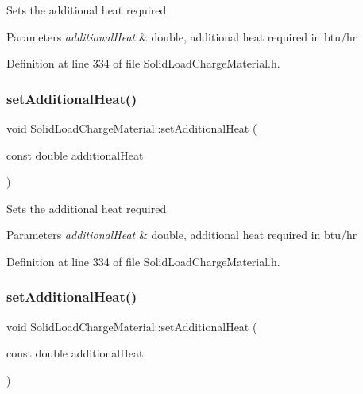 Sets the additional heat required 
\begin{DoxyParams}{Parameters}
{\em additional\+Heat} & double, additional heat required in btu/hr \\
\hline
\end{DoxyParams}


Definition at line 334 of file Solid\+Load\+Charge\+Material.\+h.

\mbox{\label{class_solid_load_charge_material_a849fd29a3ecb95be2e9d34f9280b1b94}} 
\subsubsection{\texorpdfstring{set\+Additional\+Heat()}{setAdditionalHeat()}\hspace{0.1cm}{\footnotesize\ttfamily [2/3]}}
{\footnotesize\ttfamily void Solid\+Load\+Charge\+Material\+::set\+Additional\+Heat (\begin{DoxyParamCaption}\item[{const double}]{additional\+Heat }\end{DoxyParamCaption})\hspace{0.3cm}{\ttfamily [inline]}}

Sets the additional heat required 
\begin{DoxyParams}{Parameters}
{\em additional\+Heat} & double, additional heat required in btu/hr \\
\hline
\end{DoxyParams}


Definition at line 334 of file Solid\+Load\+Charge\+Material.\+h.

\mbox{\label{class_solid_load_charge_material_a849fd29a3ecb95be2e9d34f9280b1b94}} 
\subsubsection{\texorpdfstring{set\+Additional\+Heat()}{setAdditionalHeat()}\hspace{0.1cm}{\footnotesize\ttfamily [3/3]}}
{\footnotesize\ttfamily void Solid\+Load\+Charge\+Material\+::set\+Additional\+Heat (\begin{DoxyParamCaption}\item[{const double}]{additional\+Heat }\end{DoxyParamCaption})\hspace{0.3cm}{\ttfamily [inline]}}

